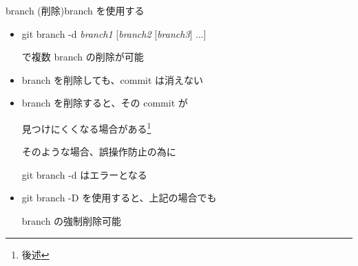 \begin{frame}[t]{branch (削除)}{branch を使用する}

  \begin{itemize}
  \item git branch -d \textit{branch1} [\textit{branch2} [\textit{branch3}] ...]

    で複数 branch の削除が可能
    \vspace{2ex}

  \item branch を削除しても、commit は消えない
     \vspace{2ex}

  \item branch を削除すると、その commit が

    見つけにくくなる場合がある\footnote{後述}

    そのような場合、誤操作防止の為に

    git branch -d はエラーとなる
    \vspace{2ex}

  \item git branch -D を使用すると、上記の場合でも

    branch の強制削除可能
  \end{itemize}

\end{frame}
